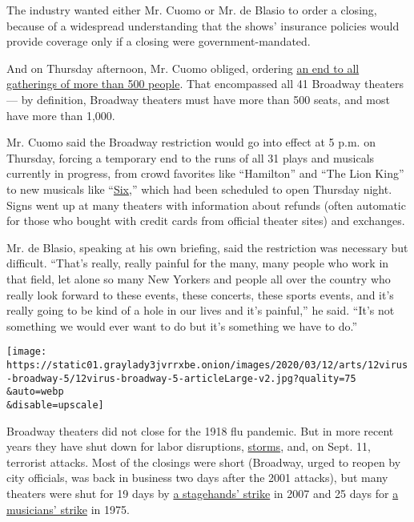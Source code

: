 The industry wanted either Mr. Cuomo or Mr. de Blasio to order a
closing, because of a widespread understanding that the shows' insurance
policies would provide coverage only if a closing were
government-mandated.

And on Thursday afternoon, Mr. Cuomo obliged, ordering
\href{https://www.governor.ny.gov/news/during-novel-coronavirus-briefing-governor-cuomo-announces-new-mass-gatherings-regulations}{an
end to all gatherings of more than 500 people}. That encompassed all 41
Broadway theaters --- by definition, Broadway theaters must have more
than 500 seats, and most have more than 1,000.

Mr. Cuomo said the Broadway restriction would go into effect at 5 p.m.
on Thursday, forcing a temporary end to the runs of all 31 plays and
musicals currently in progress, from crowd favorites like ``Hamilton''
and ``The Lion King'' to new musicals like
``\href{https://www.nytimes3xbfgragh.onion/2020/02/27/theater/six-broadway.html}{Six},''
which had been scheduled to open Thursday night. Signs went up at many
theaters with information about refunds (often automatic for those who
bought with credit cards from official theater sites) and exchanges.

Mr. de Blasio, speaking at his own briefing, said the restriction was
necessary but difficult. ``That's really, really painful for the many,
many people who work in that field, let alone so many New Yorkers and
people all over the country who really look forward to these events,
these concerts, these sports events, and it's really going to be kind of
a hole in our lives and it's painful,'' he said. ``It's not something we
would ever want to do but it's something we have to do.''

\texttt{[image: https://static01.graylady3jvrrxbe.onion/images/2020/03/12/arts/12virus-broadway-5/12virus-broadway-5-articleLarge-v2.jpg?quality=75\\\&auto=webp\\\&disable=upscale]}

Broadway theaters did not close for the 1918 flu pandemic. But in more
recent years they have shut down for labor disruptions,
\href{https://nyti.ms/1NtiI84}{storms}, and, on Sept. 11, terrorist
attacks. Most of the closings were short (Broadway, urged to reopen by
city officials, was back in business two days after the 2001 attacks),
but many theaters were shut for 19 days by
\href{https://www.nytimes3xbfgragh.onion/2007/11/29/theater/29broadway.html}{a
stagehands' strike} in 2007 and 25 days for
\href{https://www.nytimes3xbfgragh.onion/1975/10/13/archives/musicians-and-producers-ratify-a-3year-pact-musicians-and-producers.html}{a
musicians' strike} in 1975.

